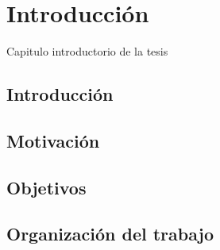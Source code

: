 \chapter{Introducción}
\label{intro}

Capitulo introductorio de la tesis

\newpage
\section{Introducción}

\section{Motivación}

\section{Objetivos}

\section{Organización del trabajo}